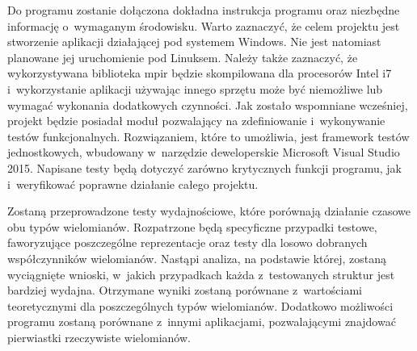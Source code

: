 Do programu zostanie dołączona dokładna instrukcja programu oraz niezbędne informację o~wymaganym środowisku. Warto zaznaczyć, że celem projektu jest stworzenie aplikacji działającej pod systemem Windows. Nie jest natomiast planowane jej uruchomienie pod Linuksem. Należy także zaznaczyć, że wykorzystywana biblioteka mpir będzie skompilowana dla procesorów Intel i7 i~wykorzystanie aplikacji używając innego sprzętu może być niemożliwe lub wymagać wykonania dodatkowych czynności.
Jak zostało wspomniane wcześniej, projekt będzie posiadał moduł pozwalający na zdefiniowanie i~wykonywanie testów funkcjonalnych. Rozwiązaniem, które to umożliwia, jest framework testów jednostkowych, wbudowany w~narzędzie deweloperskie Microsoft Visual Studio 2015. Napisane testy będą dotyczyć zarówno krytycznych funkcji programu, jak i~weryfikować poprawne działanie całego projektu.

Zostaną przeprowadzone testy wydajnościowe, które porównają działanie czasowe obu typów wielomianów. Rozpatrzone będą specyficzne przypadki testowe, faworyzujące poszczególne reprezentacje oraz testy dla losowo dobranych współczynników wielomianów. Nastąpi analiza, na podstawie której, zostaną wyciągnięte wnioski, w~jakich przypadkach każda z~testowanych struktur jest bardziej wydajna. Otrzymane wyniki zostaną porównane z~wartościami teoretycznymi dla poszczególnych typów wielomianów. Dodatkowo możliwości programu zostaną porównane z~innymi aplikacjami, pozwalającymi znajdować pierwiastki rzeczywiste wielomianów.
